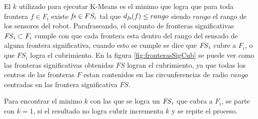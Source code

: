 El $k$ utilizado para ejecutar K-Means es el minimo que logra que para toda
frontera $f\in F_i$ existe $\mathit{fs} \in FS_i$ tal que $d_{\mathit{fs}}(f) \leq
rango$ siendo $rango$ el rango de los sensores del robot. Parafraseando, el
conjunto de fronteras significativas $\mathit{FS}_i \subset F_i$ cumple con que
cada frontera esta dentro del rango del sensado de alguna frontera
significativa, cuando esto se cumple se dice que $\mathit{FS}_i$ cubre a $F_i$, o
que $FS_i$ logra el cubrimiento. En la figura \ref{fig:fronterasSigCub} se
puede ver como las fronteras significativas obtenidas $FS$ logran el
cubrimiento, ya que todas los centros de las fronteras $F$ estan contenidos en
las circunferencias de radio $rango$ centradas en las frontera significativa
$FS$.

Para encontrar el minimo $k$ con las que se logra un $\mathit{FS}_i$ que cubra a
$F_i$, se parte con $k=1$, si el resultado no logra cubrir incrementa $k$ y se
repite el proceso.


